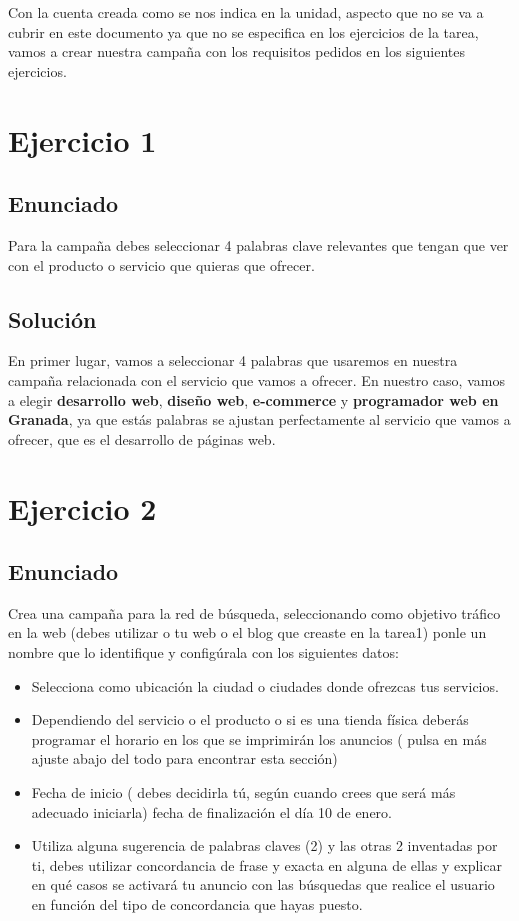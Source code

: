 Con la cuenta creada como se nos indica en la unidad, aspecto que no se va a cubrir en este documento ya que no se especifica en los ejercicios de la tarea, vamos a crear nuestra campaña con los requisitos pedidos en los siguientes ejercicios.

\section{Ejercicio 1}

\subsection{Enunciado}
Para la campaña debes seleccionar 4 palabras clave relevantes que tengan que ver con el producto o servicio que quieras  que ofrecer.

\subsection{Solución}
En primer lugar, vamos a seleccionar 4 palabras que usaremos en nuestra campaña relacionada con el servicio que vamos a ofrecer. En nuestro caso, vamos a elegir \textbf{desarrollo web}, \textbf{diseño web}, \textbf{e-commerce} y \textbf{programador web en Granada}, ya que estás palabras se ajustan perfectamente al servicio que vamos a ofrecer, que es el desarrollo de páginas web.

\section{Ejercicio 2}

\subsection{Enunciado}
Crea una campaña para la red de búsqueda, seleccionando como objetivo tráfico en la web (debes utilizar o tu web o el blog que creaste en la tarea1)  ponle un nombre que lo identifique y configúrala con los siguientes datos:

\begin{itemize}
    \item Selecciona como ubicación la ciudad o ciudades donde ofrezcas tus servicios.
    \item Dependiendo del servicio o el producto o si es una tienda física deberás programar el horario en los que se imprimirán los anuncios  ( pulsa en más ajuste abajo del todo para encontrar esta sección)
    \item Fecha de inicio ( debes decidirla tú, según cuando crees que será más adecuado iniciarla) fecha de finalización  el día 10 de enero.
    \item Utiliza alguna sugerencia de palabras claves (2) y las otras 2 inventadas por ti, debes utilizar concordancia de frase y exacta en alguna de ellas y explicar en qué casos se activará tu anuncio con las búsquedas que realice el usuario en función del tipo de concordancia que hayas puesto.
\end{itemize}

